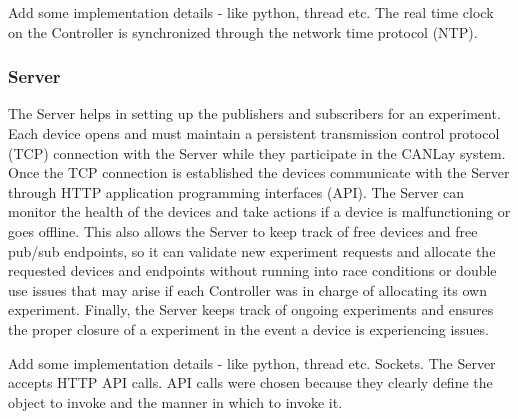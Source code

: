 \documentclass[letterpaper,twocolumn,12pt]{article}
\begin{document}
Add some implementation details - like python, thread etc.
The real time clock on the Controller is synchronized through the network time protocol (NTP).

\subsubsection{Server}
The Server helps in setting up the publishers and subscribers for an experiment. Each device opens and must maintain a persistent transmission control protocol (TCP) connection with the Server while they participate in the CANLay system. Once the TCP connection is established the devices communicate with the Server through HTTP application programming interfaces (API). The Server can monitor the health of the devices and take actions if a device is malfunctioning or goes offline. This also allows the Server to keep track of free devices and free pub/sub endpoints, so it can validate new experiment requests and allocate the requested devices and endpoints without running into race conditions or double use issues that may arise if each Controller was in charge of allocating its own experiment. Finally, the Server keeps track of ongoing experiments and ensures the proper closure of a experiment in the event a device is experiencing issues.

Add some implementation details - like python, thread etc. Sockets.
The Server accepts HTTP API calls. API calls were chosen because they clearly define the object to invoke and the manner in which to invoke it.


\end{document}
